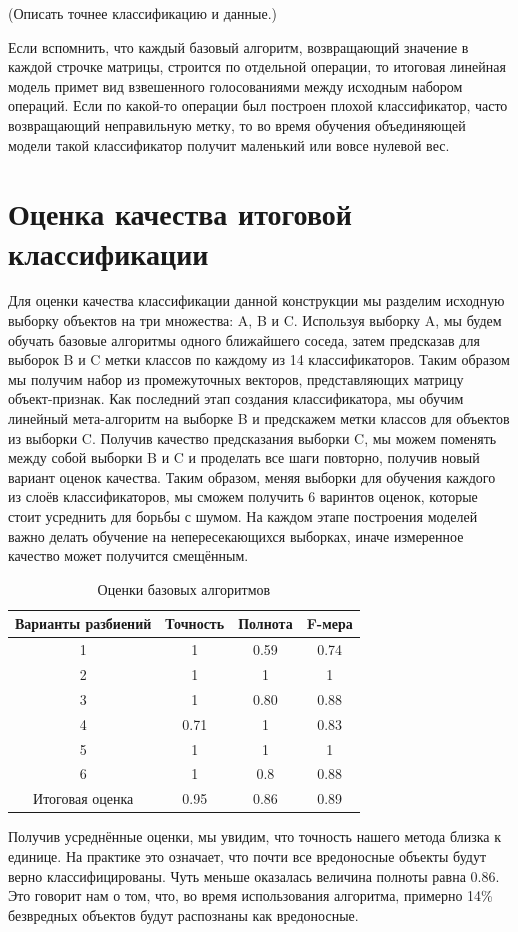(Описать точнее классификацию и данные.)

Если вспомнить, что каждый базовый алгоритм, возвращающий значение в каждой строчке матрицы, строится по отдельной операции, то итоговая линейная модель примет вид взвешенного голосованиями между исходным набором операций. Если по какой-то операции был построен плохой классификатор, часто возвращающий неправильную метку, то во время обучения объединяющей модели такой классификатор получит маленький или вовсе нулевой вес.

\section{Оценка качества итоговой классификации}

Для оценки качества классификации данной конструкции мы разделим исходную выборку объектов на три множества: A, B и C. Используя выборку A, мы будем обучать базовые алгоритмы одного ближайшего соседа, затем предсказав для выборок B и C метки классов по каждому из 14 классификаторов. Таким образом мы получим набор из промежуточных векторов, представляющих матрицу объект-признак. Как последний этап создания классификатора, мы обучим линейный мета-алгоритм на выборке B и предскажем метки классов для объектов из выборки C. Получив качество предсказания выборки C, мы можем поменять между собой выборки B и C и проделать все шаги повторно, получив новый вариант оценок качества. Таким образом, меняя выборки для обучения каждого из слоёв классификаторов, мы сможем получить 6 варинтов оценок, которые стоит усреднить для борьбы с шумом. На каждом этапе построения моделей важно делать обучение на непересекающихся выборках, иначе измеренное качество может получится смещённым.

\newpage
\bgroup
\def\arraystretch{1.5}%
\begin{table}[ht]
\caption{Оценки базовых алгоритмов}
\label{tab_weight}
\centering
    \begin{tabular}{|c|c|c|c|}
	\hline Варианты разбиений & Точность & Полнота & F-мера \\
	\hline 1 & 1 & 0.59 & 0.74 \\
	\hline 2 & 1 & 1 & 1 \\
	\hline 3 & 1 & 0.80 & 0.88 \\
	\hline 4 & 0.71 & 1 & 0.83 \\
	\hline 5 & 1 & 1 & 1 \\
	\hline 6 & 1 & 0.8 & 0.88 \\
	\hline Итоговая оценка & 0.95 & 0.86 & 0.89 \\
	\hline
    \end{tabular}
\end{table}
\egroup

Получив усреднённые оценки, мы увидим, что точность нашего метода близка к единице. На практике это означает, что почти все вредоносные объекты будут верно классифицированы. Чуть меньше оказалась величина полноты равна 0.86. Это говорит нам о том, что, во время использования алгоритма, примерно 14\% безвредных объектов будут распознаны как вредоносные.